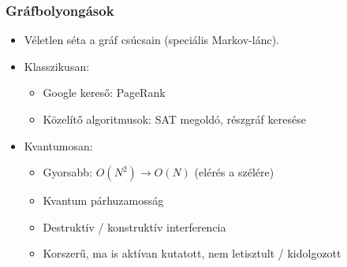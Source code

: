 \documentclass[aspectratio=169]{beamer}
\begin{document}
\begin{frame}
  \frametitle{Gráfbolyongások}
  
  \begin{itemize}
    \item Véletlen séta a gráf csúcsain (speciális Markov-lánc).
    \item Klasszikusan:
    \begin{itemize}
        \item Google kereső: PageRank
        \item Közelítő algoritmusok: SAT megoldó, részgráf keresése
    \end{itemize}
    \item Kvantumosan:
    \begin{itemize}
        \item Gyorsabb: $O(N^2) \rightarrow O(N)$ (elérés a szélére)
        \item Kvantum párhuzamosság
        \item Destruktív / konstruktív interferencia
        \item Korszerű, ma is aktívan kutatott, nem letisztult / kidolgozott
    \end{itemize}
  \end{itemize}
\end{frame}
\end{document}
